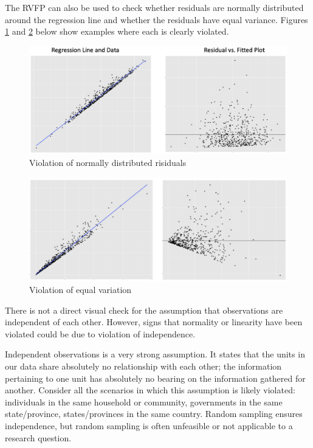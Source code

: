 \documentclass[
]{book}
\begin{document}
The RVFP can also be used to check whether residuals are normally distributed around the regression line and whether the residuals have equal variance. Figures \ref{fig:rvfpnormal} and \ref{fig:rvfpequal} below show examples where each is clearly violated.

\begin{figure}

{\centering \includegraphics[width=\textwidth]{images/rvfp_normal} 

}

\caption{Violation of normally distributed risiduals}\label{fig:rvfpnormal}
\end{figure}

\begin{figure}

{\centering \includegraphics[width=\textwidth]{images/rvfp_equal} 

}

\caption{Violation of equal variation}\label{fig:rvfpequal}
\end{figure}

There is not a direct visual check for the assumption that observations are independent of each other. However, signs that normality or linearity have been violated could be due to violation of independence.

Independent observations is a very strong assumption. It states that the units in our data share absolutely no relationship with each other; the information pertaining to one unit has absolutely no bearing on the information gathered for another. Consider all the scenarios in which this assumption is likely violated: individuals in the same household or community, governments in the same state/province, states/provinces in the same country. Random sampling ensures independence, but random sampling is often unfeasible or not applicable to a research question.
\end{document}
